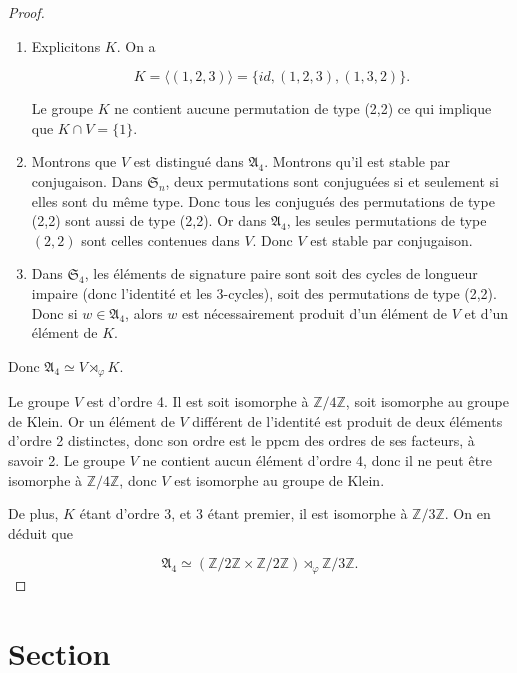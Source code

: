 \documentclass[french]{report}
\begin{document}
\begin{proof}
  \

  \begin{enumerate}
    \item Explicitons $K$. On a

    $$ K = \langle (1,2,3) \rangle = \{ id, (1,2,3), (1,3,2) \}.$$

    Le groupe $K$ ne contient aucune permutation de type (2,2) ce qui implique que $K \cap V = \{ 1 \} $.

    \item Montrons que $V $ est distingué dans $\mathfrak{A}_4$. Montrons qu'il est stable par conjugaison. Dans $\mathfrak{S}_n$, deux permutations sont conjuguées si et seulement si elles sont du même type. Donc tous les conjugués des permutations de type (2,2) sont aussi de type (2,2). Or dans $\mathfrak{A}_4$, les seules permutations de type $(2,2)$ sont celles contenues dans $V$. Donc $V$ est stable par conjugaison.

    \item Dans  $\mathfrak{S}_{4} $, les éléments de signature paire sont soit des cycles de longueur impaire (donc l'identité et les 3-cycles), soit des permutations de type (2,2). Donc si $w \in \mathfrak{A}_4$, alors $w$ est nécessairement produit d'un élément de $V$ et d'un élément de $K$.
  \end{enumerate}

  Donc $\mathfrak{A}_4 \simeq V \rtimes _{ \varphi} K$.

  Le groupe $V$ est d'ordre 4. Il est soit isomorphe à $\mathbb{Z}/{ 4 }\mathbb{Z}$, soit isomorphe au groupe de Klein. Or un élément de $V $ différent de l'identité est produit de deux éléments d'ordre 2 distinctes, donc son ordre est le ppcm des ordres de ses facteurs, à savoir 2. Le groupe $V$ ne contient aucun élément d'ordre 4, donc il ne peut être isomorphe à $\mathbb{Z}/{ 4 }\mathbb{Z}$, donc $V$ est isomorphe au groupe de Klein.

  De plus, $K$ étant d'ordre 3, et 3 étant premier, il est isomorphe à $\mathbb{Z}/{ 3 }\mathbb{Z}$. On en déduit que

  $$ \mathfrak{A}_4 \simeq (\mathbb{Z}/{ 2 }\mathbb{Z} \times \mathbb{Z}/{ 2 }\mathbb{Z}) \rtimes _{\varphi} \mathbb{Z}/{ 3 }\mathbb{Z}.$$
\end{proof}



\section{Section}
\end{document}
